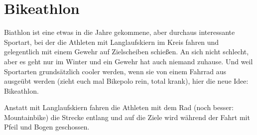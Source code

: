 \documentclass[a5paper,pagesize,10pt,bibtotoc,pointlessnumbers,normalheadings,DIV=9,twoside=false]{scrbook}
\begin{document}



\chapter{Bikeathlon}

Biathlon ist eine etwas in die Jahre gekommene, aber durchaus interessante Sportart, bei der die Athleten mit Langlaufskiern im Kreis fahren und gelegentlich mit einem Gewehr auf Zielscheiben schießen.
An sich nicht schlecht, aber es geht nur im Winter und ein Gewehr hat auch niemand zuhause.
Und weil Sportarten grundsätzlich cooler werden, wenn sie von einem Fahrrad aus ausgeübt werden (zieht euch mal Bikepolo rein, total krank), hier die neue Idee: Bikeathlon.

Anstatt mit Langlaufskiern fahren die Athleten mit dem Rad (noch besser: Mountainbike) die Strecke entlang und auf die Ziele wird während der Fahrt mit Pfeil und Bogen geschossen.



\end{document}
